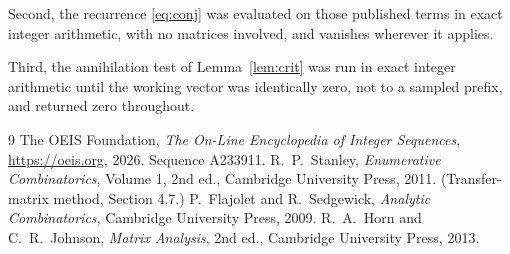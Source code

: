 \documentclass[11pt,a4paper]{article}
\theoremstyle{plain}
\theoremstyle{definition}
\begin{document}
Second, the recurrence \eqref{eq:conj} was evaluated on those published terms in exact
integer arithmetic, with no matrices involved, and vanishes wherever it applies.

Third, the annihilation test of Lemma~\ref{lem:crit} was run in exact integer arithmetic
until the working vector was identically zero, not to a sampled prefix, and returned zero
throughout.

\begin{thebibliography}{9}
 The OEIS Foundation, \emph{The On-Line Encyclopedia of Integer
Sequences}, \url{https://oeis.org}, 2026. Sequence A233911.
 R.~P.~Stanley, \emph{Enumerative Combinatorics}, Volume 1, 2nd ed.,
Cambridge University Press, 2011. (Transfer-matrix method, Section 4.7.)
 P.~Flajolet and R.~Sedgewick, \emph{Analytic Combinatorics}, Cambridge
University Press, 2009.
 R.~A.~Horn and C.~R.~Johnson, \emph{Matrix Analysis}, 2nd ed., Cambridge
University Press, 2013.
\end{thebibliography}
\end{document}
